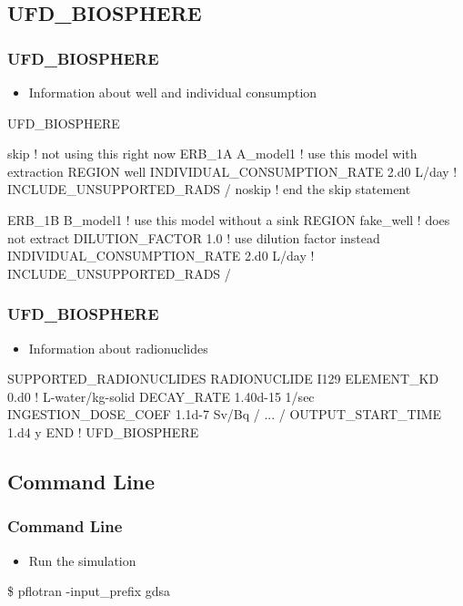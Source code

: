 \documentclass{beamer}
\newcommand\bluecomment[1]{{{\color{blue} #1}}}
\begin{document}
\subsection{UFD\_BIOSPHERE}
\begin{frame}[fragile]\frametitle{UFD\_BIOSPHERE}

\begin{itemize}
  \item Information about well and individual consumption
\end{itemize}

\begin{semiverbatim}\small
UFD_BIOSPHERE

skip \bluecomment{! not using this right now}
  ERB_1A A_model1 \bluecomment{! use this model with extraction}
    REGION well
    INDIVIDUAL_CONSUMPTION_RATE 2.d0 L/day
    \bluecomment{! INCLUDE_UNSUPPORTED_RADS}
  /
noskip \bluecomment{! end the skip statement}

  ERB_1B B_model1 \bluecomment{! use this model without a sink}
    REGION fake_well \bluecomment{! does not extract}
    DILUTION_FACTOR 1.0 \bluecomment{! use dilution factor instead}
    INDIVIDUAL_CONSUMPTION_RATE 2.d0 L/day
    \bluecomment{! INCLUDE_UNSUPPORTED_RADS}
  /

\end{semiverbatim}
\end{frame}

\begin{frame}[fragile]\frametitle{UFD\_BIOSPHERE}

\begin{itemize}
  \item Information about radionuclides
\end{itemize}

\begin{semiverbatim}\small
  SUPPORTED_RADIONUCLIDES
    RADIONUCLIDE I129
      ELEMENT_KD 0.d0  \bluecomment{! L-water/kg-solid}
      DECAY_RATE 1.40d-15 1/sec
      INGESTION_DOSE_COEF 1.1d-7 Sv/Bq
    /
    \bluecomment{...}
  /
  OUTPUT_START_TIME 1.d4 y
END \bluecomment{! UFD_BIOSPHERE}
\end{semiverbatim}
\end{frame}

\subsection{Command Line}
\begin{frame}[fragile]\frametitle{Command Line}

\begin{itemize}
  \item Run the simulation
\end{itemize}
\begin{semiverbatim}
\$ pflotran -input_prefix gdsa
\end{semiverbatim}

\end{frame}
\end{document}
